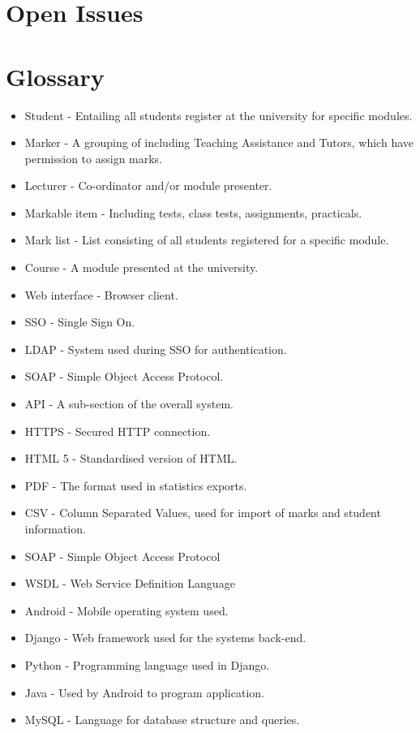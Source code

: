 \documentclass[12pt]{article}
\begin{document}
		\newpage
		\vspace{0.2in}
		
	\section{Open Issues}
	
		\vspace{0.2in}
		
	\section{Glossary}
	
		\vspace{0.2in}
		\begin{itemize}
			\item Student - Entailing all students register at the university for specific modules.
			\item Marker - A grouping of including Teaching Assistance and Tutors, which have permission to assign marks.
			\item Lecturer - Co-ordinator and/or module presenter.
			
			\item Markable item - Including tests, class tests, assignments, practicals.
			\item Mark list - List consisting of all students registered for a specific module.
			\item Course - A module presented at the university.
			
			\item Web interface - Browser client.
			\item SSO - Single Sign On.
			\item LDAP - System used during SSO for authentication.
			\item SOAP - Simple Object Access Protocol.
			\item API -	A sub-section of the overall system.
			\item HTTPS - Secured HTTP connection.
			\item HTML 5 - Standardised version of HTML.
			\item PDF -	The format used in statistics exports.
			\item CSV -	Column Separated Values, used for import of marks and student information.
			\item SOAP - Simple Object Access Protocol	
			\item WSDL - Web Service Definition Language
			\item Android - Mobile operating system used.
			\item Django - Web framework used for the systems back-end.
			\item Python - Programming language used in Django.
			\item Java - Used by Android to program application.
			\item MySQL - Language for database structure and queries.
		\end{itemize}	
	
\end{document}
